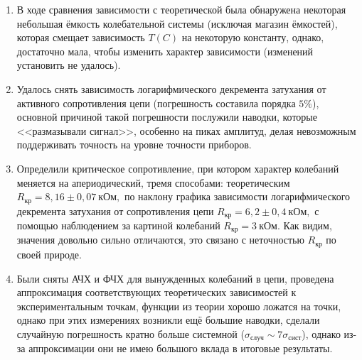 \documentclass[a4paper,12pt]{extarticle}
\begin{document}
\begin{enumerate}
    \item В ходе сравнения зависимости с теоретической была обнаружена некоторая небольшая ёмкость колебательной системы (исключая магазин ёмкостей), которая смещает зависимость $T(C)$ на некоторую константу, однако, достаточно мала, чтобы изменить характер зависимости (изменений установить не удалось).
    \item Удалось снять зависимость логарифмического декремента затухания от активного сопротивления цепи (погрешность составила порядка $5\%$), основной причиной такой погрешности послужили наводки, которые <<размазывали сигнал>>, особенно на пиках амплитуд, делая невозможным поддерживать точность на уровне точности приборов.
    \item Определили критическое сопротивление, при котором характер колебаний меняется на апериодический, тремя способами: теоретическим $R_\text{кр} = 8,16 \pm 0,07 \ \text{кОм},$ по наклону графика зависимости логарифмического декремента затухания от сопротивления цепи $R_\text{кр} = 6,2 \pm 0,4 \ \text{кОм},$ с помощью наблюдением за картиной колебаний $R_\text{кр} = 3 \ \text{кОм}.$ Как видим, значения довольно сильно отличаются, это связано с неточностью $R_\text{кр}$ по своей природе.

    \item Были сняты АЧХ и ФЧХ для вынужденных колебаний в цепи, проведена аппроксимация соответствующих теоретических зависимостей к экспериментальным точкам, функции из теории хорошо ложатся на точки, однако при этих измерениях возникли ещё большие наводки, сделали случайную погрешность кратно больше системной ($\sigma_\text{случ} \sim 7 \sigma_\text{сист}$), однако из-за аппроксимации они не имею большого вклада в итоговые результаты.


\end{enumerate}
\end{document}
